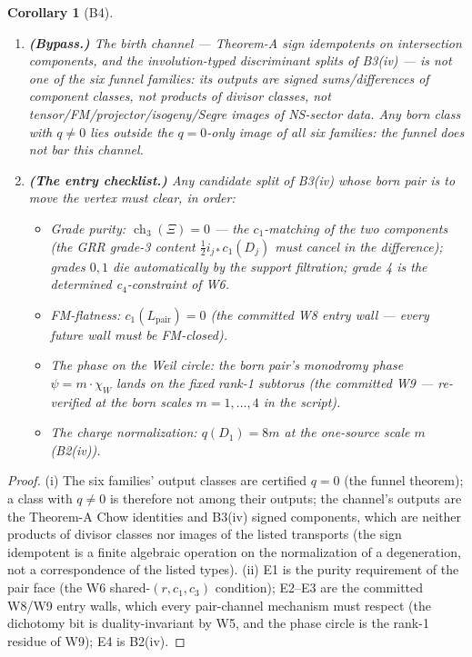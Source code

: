 \documentclass[11pt]{article}
\newtheorem{corollary}[lemma]{Corollary}
\newcommand{\ch}{\operatorname{ch}}
\begin{document}
\begin{corollary}[B4]
\begin{enumerate}
\item[(i)] \textbf{(Bypass.)} The birth channel --- Theorem-A sign idempotents
on intersection components, and the involution-typed discriminant splits of
B3(iv) --- is not one of the six funnel families: its outputs are signed
sums/differences of component classes, not products of divisor classes, not
tensor/FM/projector/isogeny/Segre images of NS-sector data. Any born class
with $q \ne 0$ lies outside the $q = 0$-only image of all six families: the
funnel does not bar this channel.
\item[(ii)] \textbf{(The entry checklist.)} Any candidate split of B3(iv)
whose born pair is to move the vertex must clear, in order:
\begin{itemize}
\item[\textbf{E1}] \emph{Grade purity:} $\ch_3(\Xi) = 0$ --- the
$c_1$-matching of the two components (the GRR grade-3 content
$\frac{1}{2}i_{j*}c_1(D_j)$ must cancel in the difference); grades $0,1$ die
automatically by the support filtration; grade 4 is the determined
c$_4$-constraint of W6.
\item[\textbf{E2}] \emph{FM-flatness:} $c_1(L_{\text{pair}}) = 0$ (the
committed W8 entry wall --- every future wall must be FM-closed).
\item[\textbf{E3}] \emph{The phase on the Weil circle:} the born pair's
monodromy phase $\psi = m\cdot\chi_W$ lands on the fixed rank-1 subtorus (the
committed W9 --- re-verified at the born scales $m = 1,\dots,4$ in the
script).
\item[\textbf{E4}] \emph{The charge normalization:} $q(D_1) = 8m$ at the
one-source scale $m$ (B2(iv)).
\end{itemize}
\end{enumerate}
\end{corollary}

\begin{proof}
(i) The six families' output classes are certified $q = 0$ (the funnel
theorem); a class with $q \ne 0$ is therefore not among their outputs; the
channel's outputs are the Theorem-A Chow identities and B3(iv) signed
components, which are neither products of divisor classes nor images of the
listed transports (the sign idempotent is a finite algebraic operation on the
normalization of a degeneration, not a correspondence of the listed types).
(ii) E1 is the purity requirement of the pair face (the W6 shared-$(r, c_1,
c_3)$ condition); E2--E3 are the committed W8/W9 entry walls, which every
pair-channel mechanism must respect (the dichotomy bit is duality-invariant
by W5, and the phase circle is the rank-1 residue of W9); E4 is B2(iv).
\end{proof}
\end{document}

